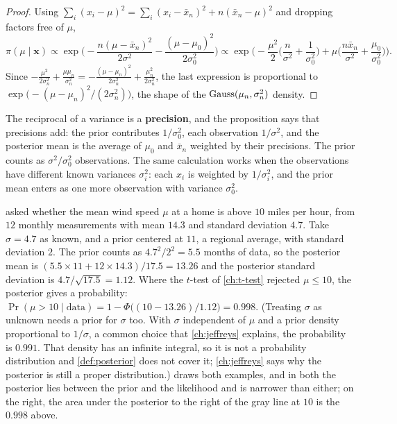 \begin{proof}
Using $\sum_i(x_i - \mu)^2 = \sum_i(x_i - \bar{x}_n)^2 + n(\bar{x}_n - \mu)^2$ and dropping factors free of $\mu$,
\[
\pi(\mu \mid \mathbf{x}) \propto \exp\Big(-\frac{n(\mu - \bar{x}_n)^2}{2\sigma^2} - \frac{(\mu - \mu_0)^2}{2\sigma_0^2}\Big) \propto \exp\Big(-\frac{\mu^2}{2}\Big(\frac{n}{\sigma^2} + \frac{1}{\sigma_0^2}\Big) + \mu\Big(\frac{n\bar{x}_n}{\sigma^2} + \frac{\mu_0}{\sigma_0^2}\Big)\Big).
\]
Since $-\frac{\mu^2}{2\sigma_n^2} + \frac{\mu\mu_n}{\sigma_n^2} = -\frac{(\mu - \mu_n)^2}{2\sigma_n^2} + \frac{\mu_n^2}{2\sigma_n^2}$, the last expression is proportional to $\exp\big(-(\mu - \mu_n)^2/(2\sigma_n^2)\big)$, the shape of the $\text{Gauss}(\mu_n, \sigma_n^2)$ density.
\end{proof}

The reciprocal of a variance is a \textbf{precision}, and the proposition says that precisions add: the prior contributes $1/\sigma_0^2$, each observation $1/\sigma^2$, and the posterior mean is the average of $\mu_0$ and $\bar{x}_n$ weighted by their precisions.
The prior counts as $\sigma^2/\sigma_0^2$ observations.
The same calculation works when the observations have different known variances $\sigma_i^2$: each $x_i$ is weighted by $1/\sigma_i^2$, and the prior mean enters as one more observation with variance $\sigma_0^2$.

 asked whether the mean wind speed $\mu$ at a home is above $10$ miles per hour, from $12$ monthly measurements with mean $14.3$ and standard deviation $4.7$.
Take $\sigma = 4.7$ as known, and a prior centered at $11$, a regional average, with standard deviation $2$.
The prior counts as $4.7^2/2^2 = 5.5$ months of data, so the posterior mean is $(5.5 \times 11 + 12 \times 14.3)/17.5 = 13.26$ and the posterior standard deviation is $4.7/\sqrt{17.5} = 1.12$.
Where the $t$-test of \cref{ch:t-test} rejected $\mu \leq 10$, the posterior gives a probability: $\Pr(\mu > 10 \mid \text{data}) = 1 - \Phi\big((10 - 13.26)/1.12\big) = 0.998$.
(Treating $\sigma$ as unknown needs a prior for $\sigma$ too. With $\sigma$ independent of $\mu$ and a prior density proportional to $1/\sigma$, a common choice that \cref{ch:jeffreys} explains, the probability is $0.991$. That density has an infinite integral, so it is not a probability distribution and \cref{def:posterior} does not cover it; \cref{ch:jeffreys} says why the posterior is still a proper distribution.)
 draws both examples, and in both the posterior lies between the prior and the likelihood and is narrower than either; on the right, the area under the posterior to the right of the gray line at $10$ is the $0.998$ above.

